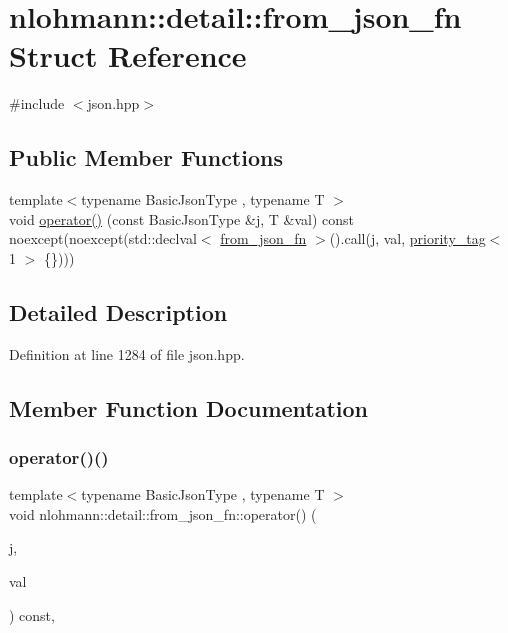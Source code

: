 \hypertarget{structnlohmann_1_1detail_1_1from__json__fn}{}\section{nlohmann\+:\+:detail\+:\+:from\+\_\+json\+\_\+fn Struct Reference}
\label{structnlohmann_1_1detail_1_1from__json__fn}


{\ttfamily \#include $<$json.\+hpp$>$}

\subsection*{Public Member Functions}
\begin{DoxyCompactItemize}
\item 
{\footnotesize template$<$typename Basic\+Json\+Type , typename T $>$ }\\void \hyperlink{structnlohmann_1_1detail_1_1from__json__fn_a48e82ad9d244fdf249caa970a253e214}{operator()} (const Basic\+Json\+Type \&j, T \&val) const noexcept(noexcept(std\+::declval$<$ \hyperlink{structnlohmann_1_1detail_1_1from__json__fn}{from\+\_\+json\+\_\+fn} $>$().call(j, val, \hyperlink{structnlohmann_1_1detail_1_1priority__tag}{priority\+\_\+tag}$<$ 1 $>$ \{\})))
\end{DoxyCompactItemize}


\subsection{Detailed Description}


Definition at line 1284 of file json.\+hpp.



\subsection{Member Function Documentation}
\mbox{\label{structnlohmann_1_1detail_1_1from__json__fn_a48e82ad9d244fdf249caa970a253e214}} 
\subsubsection{\texorpdfstring{operator()()}{operator()()}}
{\footnotesize\ttfamily template$<$typename Basic\+Json\+Type , typename T $>$ \\
void nlohmann\+::detail\+::from\+\_\+json\+\_\+fn\+::operator() (\begin{DoxyParamCaption}\item[{const Basic\+Json\+Type \&}]{j,  }\item[{T \&}]{val }\end{DoxyParamCaption}) const\hspace{0.3cm}{\ttfamily [inline]}, {\ttfamily [noexcept]}}



